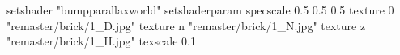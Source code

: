 setshader "bumpparallaxworld"
setshaderparam specscale 0.5 0.5 0.5
    texture 0 "remaster/brick/1_D.jpg"
    texture n "remaster/brick/1_N.jpg"
    texture z "remaster/brick/1_H.jpg"
    texscale 0.1